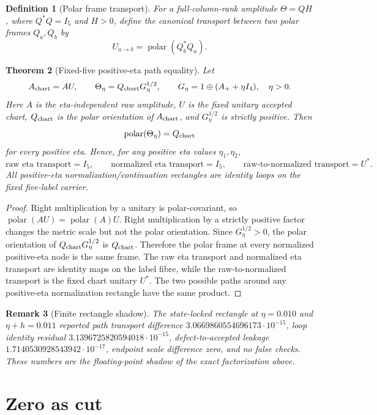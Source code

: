 \documentclass[11pt]{article}
\newtheorem{theorem}{Theorem}[section]
\newtheorem{definition}[theorem]{Definition}
\newtheorem{remark}[theorem]{Remark}
\newcommand{\polar}{\operatorname{polar}}
\begin{document}
\begin{definition}[Polar frame transport]
For a full-column-rank amplitude \(\Theta=QH\), where \(Q^*Q=I_5\) and \(H>0\), define the canonical transport between two polar frames \(Q_a,Q_b\) by
\[
U_{a\to b}=\polar(Q_b^*Q_a).
\]
\end{definition}

\begin{theorem}[Fixed-five positive-eta path equality]
Let
\[
A_{\rm chart}=AU,
\qquad
\Theta_\eta=Q_{\rm chart}G_\eta^{1/2},
\qquad
G_\eta=1\oplus(A_+ + \eta I_4),\quad \eta>0.
\]
Here \(A\) is the eta-independent raw amplitude, \(U\) is the fixed unitary accepted chart, \(Q_{\rm chart}\) is the polar orientation of \(A_{\rm chart}\), and \(G_\eta^{1/2}\) is strictly positive.  Then
\[
\polar(\Theta_\eta)=Q_{\rm chart}
\]
for every positive eta.  Hence, for any positive eta values \(\eta_1,\eta_2\),
\[
\text{raw eta transport}=I_5,
\qquad
\text{normalized eta transport}=I_5,
\qquad
\text{raw-to-normalized transport}=U^*.
\]
All positive-eta normalization/continuation rectangles are identity loops on the fixed five-label carrier.
\end{theorem}

\begin{proof}
Right multiplication by a unitary is polar-covariant, so \(\polar(AU)=\polar(A)U\).  Right multiplication by a strictly positive factor changes the metric scale but not the polar orientation.  Since \(G_\eta^{1/2}>0\), the polar orientation of \(Q_{\rm chart}G_\eta^{1/2}\) is \(Q_{\rm chart}\).  Therefore the polar frame at every normalized positive-eta node is the same frame.  The raw eta transport and normalized eta transport are identity maps on the label fibre, while the raw-to-normalized transport is the fixed chart unitary \(U^*\).  The two possible paths around any positive-eta normalization rectangle have the same product.
\end{proof}

\begin{remark}[Finite rectangle shadow]
The state-locked rectangle at \(\eta=0.010\) and \(\eta+h=0.011\) reported path transport difference \(3.0669860554696173\cdot10^{-15}\), loop identity residual \(3.1396725820594018\cdot10^{-15}\), defect-to-accepted leakage \(1.7140530928543942\cdot10^{-17}\), endpoint scale difference zero, and no false checks.  These numbers are the floating-point shadow of the exact factorization above.
\end{remark}

\section{Zero as cut}
\end{document}
